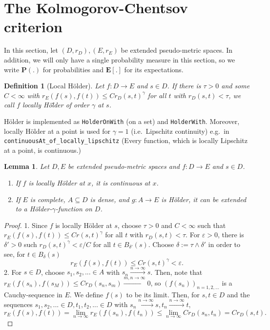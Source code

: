 \documentclass{article}
\newtheorem{lemma}[proposition]{Lemma}
\newtheorem{definition}[proposition]{Definition}
\theoremstyle{definition}
\theoremstyle{step} \newtheorem{step}{Step}
\newcommand{\leanline}[1]{\texttt{#1}}%
\begin{document}
\section{The Kolmogorov-Chentsov criterion}
In this section, let $(D, r_D), (E, r_E)$ be extended pseudo-metric
spaces. In addition, we will only have a single probability measure in
this section, so we write $\mathbf P(.)$ for probabilities and
$\mathbf E[.]$ for its expectations.

\begin{definition}[Local Hölder]
  Let $f: D\to E$ and $s\in D$. If there is $\tau>0$ and some $C <
    \infty$ with $r_E(f(s), f(t)) \leq C r_D(s,t)^\gamma$ for all $t$
  with $r_D(s,t) < \tau$, we call $f$ \emph{locally Hö\"lder of order
    $\gamma$} at $s$.
\end{definition}

Hölder is implemented as \leanline{HolderOnWith} (on a set) and
\leanline{HolderWith}. Moreover, locally Hölder at a point is used for
$\gamma=1$ (i.e.\ Lipschitz continuity) e.g.\ in
\leanline{continuousAt_of_locally_lipschitz} (Every function, which is
locally Lipschitz at a point, is continuous.)

\begin{lemma}\label{l:holderext}
  Let $D, E$ be extended pseudo-metric spaces and $f: D\to E$ and
  $s\in D$.
  \begin{enumerate}
    \item If $f$ is locally Hölder at $x$, it is continuous at $x$.
    \item If $E$ is complete, $A \subseteq D$ is dense, and $g : A \to
            E$ is Hölder, it can be extended to a Hölder-$\gamma$-function
          on $D$.
  \end{enumerate}
\end{lemma}

\begin{proof}
  1. Since $f$ is locally Hölder at $s$, choose $\tau>0$ and
  $C<\infty$ such that $r_E(f(s), f(t)) \leq Cr(s,t)^\gamma$ for all
  $t$ with $r_D(s,t) < \tau$. For $\varepsilon>0$, there is
  $\delta'>0$ such $r_D(s,t)^\gamma < \varepsilon / C$ for all $t \in
    B_{\delta'}(s)$. Choose $\delta := \tau \wedge \delta'$ in order to
  see, for $t \in B_\delta(s)$
  $$ r_E(f(s), f(t)) \leq C r(s,t)^\gamma < \varepsilon.$$ 2. For $s
    \in D$, choose $s_1,s_2,...\in A$ with $s_n \xrightarrow{n\to\infty}
    s$. Then, note that $r_E(f(s_n), f(s_M)) \leq C r_D(s_n, s_m)
    \xrightarrow{m,n\to\infty} 0$, so $(f(s_n))_{n=1,2,...}$ is a
  Cauchy-sequence in $E$. We define $f(s)$ to be its limit. Then, for
  $s,t\in D$ and the sequences $s_1, s_2,...\in D, t_1, t_2,...\in D$
  with $s_n \xrightarrow{n\to\infty}s, t_n \xrightarrow{n\to\infty}t$,
  $$ r_E(f(s), f(t)) = \lim_{n\to\infty}r_E(f(s_n), f(t_n)) \leq
    \lim_{n\to\infty} Cr_D(s_n, t_n) = Cr_D(s,t).$$
\end{proof}
\end{document}
